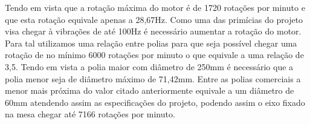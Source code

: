     Tendo em vista que a rotação máxima do motor é de 1720 rotações por minuto e que esta rotação equivale apenas a 28,67Hz. Como uma das primícias do projeto visa chegar à vibrações de até 100Hz é necessário aumentar a rotação do motor. Para tal utilizamos uma relação entre polias para que seja possível chegar uma rotação de no mínimo 6000 rotações por minuto o que equivale a uma relação de 3,5. Tendo em vista a polia maior com diâmetro de 250mm é necessário que a polia menor seja de diâmetro máximo de 71,42mm. Entre as polias comerciais a menor mais próxima do valor citado anteriormente equivale a um diâmetro de 60mm atendendo assim as especificações do projeto, podendo assim o eixo fixado na mesa chegar até 7166 rotações por minuto.

